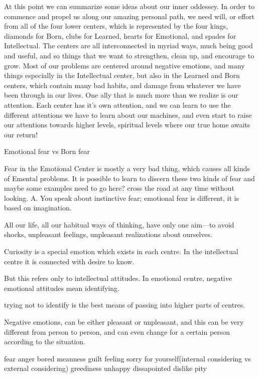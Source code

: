 \documentclass[12pt,letterpaper]{book}
\begin{document}
At this point we can summarize some ideas about our inner oddessey. In order to commence and propel us along our amazing personal path, we need will, or effort from all of the four lower centers, which is represented by the four kings, diamonds for Born, clubs for Learned, hearts for Emotional, and spades for Intellectual. The centers are all interconnected in myriad ways, much being good and useful, and so things that we want to strengthen, clean up, and encourage to grow. Most of our problems are centered around negative emotions, and many things especially in the Intellectual center, but also in the Learned and Born centers, which contain many bad habits, and damage from whatever we have been through in our lives. One ally that is much more than we realize is our attention. Each center has it's own attention, and we can learn to use the different attentions we have to learn about our machines, and even start to raise our attentions towards higher levels, spiritual levels where our true home awaits our return!

Emotional fear vs Born fear

Fear in the Emotional Center is mostly a very bad thing, which causes all kinds of Emental problems. It is possible to learn to discern these two kinds of fear and maybe some examples need to go here? cross the road at any time without looking.
A. You speak about instinctive fear; emotional fear is different, it is based
on imagination.


 All our life, all our habitual ways of thinking, have only one
aim—to avoid shocks, unpleasant feelings, unpleasant realizations about ourselves.

Curiosity is a special emotion which exists in each centre. In the intellectual centre
it is connected with desire to know.

But this refers only to intellectual attitudes. In emotional centre, negative emotional attitudes mean identifying.

 trying not to identify is the best means of passing into higher parts of centres. 

Negative emotions, can be either pleasant or unpleasant, and this can be very different from person to person, and can even change for a certain person according to the situation.

fear anger bored meanness guilt feeling sorry for yourself(internal considering vs external considering) greediness unhappy dissapointed dislike pity 

\end{document}
